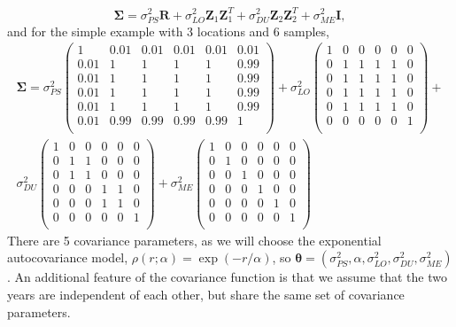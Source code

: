 \documentclass[12pt, titlepage]{article}
\begin{document}
$$
\boldsymbol{\Sigma} = \sigma^{2}_{PS}\mathbf{R} + \sigma^{2}_{LO}\mathbf{Z}_{1}\mathbf{Z}_{1}^{T} + \sigma^{2}_{DU}\mathbf{Z}_{2}\mathbf{Z}_{2}^{T} + \sigma^{2}_{ME}\mathbf{I},
$$
and for the simple example with 3 locations and 6 samples,
$$
\begin{array}{c}
\boldsymbol{\Sigma} = \sigma^{2}_{PS}\left(
\begin{array}{cccccc}
	1 & 0.01 & 0.01 & 0.01 & 0.01 & 0.01 \\
	0.01 & 1 & 1 & 1 & 1 & 0.99 \\
	0.01 & 1 & 1 & 1 & 1 & 0.99 \\
	0.01 & 1 & 1 & 1 & 1 & 0.99 \\
	0.01 & 1 & 1 & 1 & 1 & 0.99 \\
	0.01 & 0.99 & 0.99 & 0.99 & 0.99 & 1 \\
\end{array}
\right) + 
\sigma^{2}_{LO}\left(
\begin{array}{cccccc}
	1 & 0 & 0 & 0 & 0 & 0 \\
	0 & 1 & 1 & 1 & 1 & 0 \\
	0 & 1 & 1 & 1 & 1 & 0 \\
	0 & 1 & 1 & 1 & 1 & 0 \\
	0 & 1 & 1 & 1 & 1 & 0 \\
	0 & 0 & 0 & 0 & 0 & 1 \\
\end{array}
\right) + \\
\sigma^{2}_{DU}\left(
\begin{array}{cccccc}
	1 & 0 & 0 & 0 & 0 & 0 \\
	0 & 1 & 1 & 0 & 0 & 0 \\
	0 & 1 & 1 & 0 & 0 & 0 \\
	0 & 0 & 0 & 1 & 1 & 0 \\
	0 & 0 & 0 & 1 & 1 & 0 \\
	0 & 0 & 0 & 0 & 0 & 1 \\
\end{array}
\right) + 
\sigma^{2}_{ME}\left(
\begin{array}{cccccc}
	1 & 0 & 0 & 0 & 0 & 0 \\
	0 & 1 & 0 & 0 & 0 & 0 \\
	0 & 0 & 1 & 0 & 0 & 0 \\
	0 & 0 & 0 & 1 & 0 & 0 \\
	0 & 0 & 0 & 0 & 1 & 0 \\
	0 & 0 & 0 & 0 & 0 & 1 \\
\end{array}
\right)
\end{array}
$$
There are 5 covariance parameters, as we will choose the exponential autocovariance model, $\rho(r;\alpha) = \exp(-r/\alpha)$, so $\boldsymbol{\theta} = (\sigma^{2}_{PS},\alpha, \sigma^{2}_{LO},\sigma^{2}_{DU},\sigma^{2}_{ME})$.  An additional feature of the covariance function is that we assume that the two years are independent of each other, but share the same set of covariance parameters.
\end{document}
